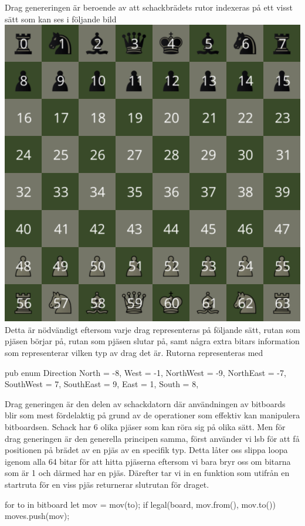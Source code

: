 \documentclass{article}
\begin{document}
Drag genereringen är beroende av att schackbrädets rutor indexeras på ett visst sätt som kan ses i följande bild
\includegraphics[scale=0.1]{board_indexed}
Detta är nödvändigt eftersom varje drag representeras på följande sätt, rutan som pjäsen börjar på, rutan som pjäsen slutar på, samt några extra bitars information som representerar vilken typ av drag det är. Rutorna representeras med

pub enum Direction {
    North = -8,
    West = -1,
    NorthWest = -9,
    NorthEast = -7,
    SouthWest = 7,
    SouthEast = 9,
    East = 1,
    South = 8,
}

Drag generingen är den delen av schackdatorn där användningen av bitboards blir som mest fördelaktig på grund av de operationer som effektiv kan manipulera bitboardsen. Schack har 6 olika pjäser som kan röra sig på olika sätt. Men för drag generingen är den generella principen samma, först använder vi lsb för att få positionen på brädet av en pjäs av en specifik typ. Detta låter oss slippa loopa igenom alla 64 bitar för att hitta pjäserna eftersom vi bara bryr oss om bitarna som är 1 och därmed har en pjäs. Därefter tar vi in en funktion som utifrån en startruta för en viss pjäs returnerar slutrutan för draget.


    for to in bitboard {
        let mov = mov(to);
        if legal(board, mov.from(), mov.to()) {
            moves.push(mov);
        }
      }
\end{document}
